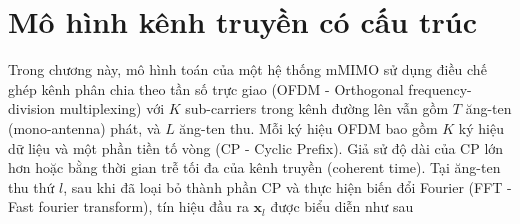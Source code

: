  

\section{Mô hình kênh truyền có cấu trúc}\label{SM}

Trong chương này, mô hình toán của một hệ thống mMIMO sử dụng điều chế ghép kênh phân chia theo tần số trực giao (OFDM - Orthogonal frequency-division multiplexing) với $K$ sub-carriers trong kênh đường lên vẫn gồm $T$ ăng-ten (mono-antenna) phát, và $L$ ăng-ten thu. Mỗi ký hiệu OFDM bao gồm $K$ ký hiệu dữ liệu và một phần tiền tố vòng (CP - Cyclic Prefix). Giả sử độ dài của CP lớn hơn hoặc bằng thời gian trễ tối đa của kênh truyền (coherent time). Tại ăng-ten thu thứ $l$, sau khi đã loại bỏ thành phần CP và thực hiện biến đổi Fourier (FFT - Fast fourier transform), tín hiệu đầu ra $\mathbf{x}_l$ được biểu diễn như sau~\cite{Ladaycia2017}


